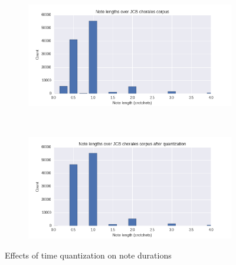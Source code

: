 \begin{figure}[htpb]
    \centering
    \begin{subfigure}[t]{0.48\textwidth}
        \centering
        \includegraphics[width=1.0\linewidth]{Figures/note-lengths-original.png}
    \end{subfigure}
    ~
    \begin{subfigure}[t]{0.48\textwidth}
        \centering
        \includegraphics[width=1.0\linewidth]{Figures/note-lengths-quantized.png}
    \end{subfigure}
    \caption{Effects of time quantization on note durations}
    \label{fig:note-lengths-time-quantization}
\end{figure}

